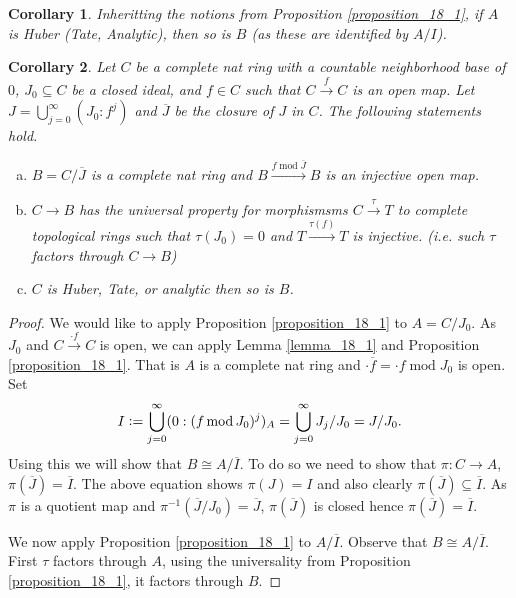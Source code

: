 \documentclass[8pt]{article}
\numberwithin{equation}{section}
\newtheorem{corollary}{Corollary} [subsection]
\DeclareMathOperator{\tmod}{mod}
\newcommand{\defeq}{\vcentcolon=}
\begin{document}
\begin{corollary}
    \label{corollary_18_1_a}
    Inheritting the notions from Proposition \ref{proposition_18_1}, if $A$ is Huber (Tate, Analytic), then so is $B$ (as these are identified by $A/I$).
\end{corollary}
\begin{corollary}
    \label{corollary_18_1}
    Let $C$ be a complete nat ring with a countable neighborhood base of $0$, $J_0\subseteq C$ be a closed ideal, and $f\in C$ such that $C\stackrel{f}{\to}C$ is an open map. Let $J = \bigcup_{j=0}^\infty (J_0:f^j)$ and $\overline{J}$ be the closure of $J$ in $C$. The following statements hold.
    \begin{enumerate}[a.]
    \item $B=C/\overline{J}$ is a complete nat ring and $B\stackrel{f\tmod\overline{J}}{\to}B$ is an injective open map.
    \item $C\to B$ has the universal property for morphismsms $C\stackrel{\tau}{\to}T$ to complete topological rings such that $\tau(J_0)=0$ and $T\stackrel{\tau(f)}{\to}T$ is injective. (i.e. such $\tau$ factors through $C\to B$)
    \item $C$ is Huber, Tate, or analytic then so is $B$.
    \end{enumerate}
\end{corollary}
\begin{proof}
    We would like to apply Proposition \ref{proposition_18_1} to $A = C/J_0$. As $J_0$ and $C\stackrel{\cdot f}{\to}C$ is open, we can apply Lemma \ref{lemma_18_1} and Proposition \ref{proposition_18_1}. That is $A$ is a complete nat ring and $\cdot \overline{f} = \cdot f\tmod{J_0}$ is open. Set
    \begin{equation*}
        I\defeq\bigcup_{j=0}^\infty(0:(f\tmod J_0)^j)_A = \bigcup_{j=0}^\infty J_j/J_0 = J/J_0.
    \end{equation*}
    Using this we will show that $B\cong A/\overline{I}$. To do so we need to show that $\pi:C\to A$, $\pi(\overline{J}) = \overline{I}$. The above equation shows $\pi(J) = I$ and also clearly $\pi(\overline{J})\subseteq\overline{I}$. As $\pi$ is a quotient map and $\pi^{-1}(\overline{J}/J_0) = \overline{J}$, $\pi(\overline{J})$ is closed hence $\pi(\overline{J})=\overline{I}$.
    \par We now apply Proposition \ref{proposition_18_1} to $A/\overline{I}$. Observe that $B\cong A/\overline{I}$. First $\tau$ factors through $A$, using the universality from Proposition \ref{proposition_18_1}, it factors through $B$. %
\end{proof}
\end{document}
